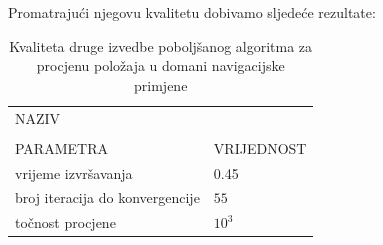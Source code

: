 \documentclass[a4paper,twoside,12pt]{memoir} %
\begin{document}
Promatrajući njegovu kvalitetu dobivamo sljedeće rezultate:
\begin{table}[H]
	\caption{Kvaliteta druge izvedbe poboljšanog algoritma za procjenu položaja u domani navigacijske primjene}
	\begin{center}
		\begin{tabular}{|p{3cm}|p{4cm}}
			\hline
			\rowcolor{lightgray}NAZIV&   \\
			\rowcolor{lightgray}&   \\
			\multirow{-3}{1cm}{ \cellcolor{lightgray}PARAMETRA} & \multirow{-3}{2cm}{\cellcolor{lightgray}VRIJEDNOST} \\
			\hline
			\vspace{0.1cm}
			vrijeme izvršavanja & \vspace{0.1cm}  0.45\\
			\vspace{0.1cm}
			broj iteracija do konvergencije & \vspace{0.1cm} $55$ \\
			\vspace{0.1cm}
			točnost procjene & \vspace{0.1cm} $10^3$ \\
			\hline
		\end{tabular}
	\end{center}
\end{table}
\end{document}
